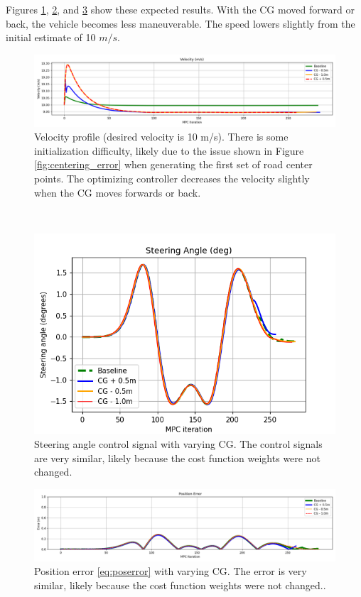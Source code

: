 \documentclass[conference]{IEEEtran}
\begin{document}
Figures \ref{fig:velocity_low_cg}, \ref{fig:steering_low_cg}, and \ref{fig:errors_cg} show these expected results. With the CG moved forward or back, the vehicle becomes less maneuverable. The speed lowers slightly from the initial estimate of 10 $m/s$. 

\begin{figure}[h!]
	\includegraphics[width=1.0\linewidth]{velocity_cg.png}
	\caption{Velocity profile (desired velocity is 10 m/s). There is some initialization difficulty, likely due to the issue shown in Figure \ref{fig:centering_error}  when  generating the first set of road center points. The optimizing controller decreases the velocity slightly when the CG moves forwards or back.}
	\label{fig:velocity_low_cg}
\end{figure}\

\begin{figure}[h!]
	\includegraphics[width=1.0\linewidth]{steering_angle_cg.png}
	\caption{Steering angle control signal with varying CG. The control signals are very similar, likely because the cost function weights were not changed.}
	\label{fig:steering_low_cg}
\end{figure}

\begin{figure}[h!]
	\includegraphics[width=1.0\linewidth]{errors_cg.png}
	\caption{Position error \eqref{eq:poserror} with varying CG. The error is very similar, likely because the cost function weights were not changed..}
	\label{fig:errors_cg}
\end{figure}
\end{document}
